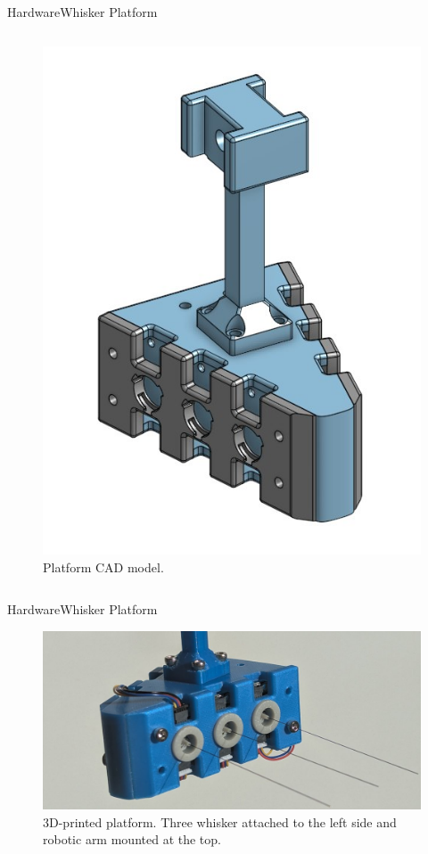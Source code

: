 \documentclass[AIRbeamer
,optEnglish
,optBiber
,optBibstyleAlphabetic
,optBeamerClassicFormat%
]{AIRlatex}
\begin{document}
\begin{frame}[c]{Hardware}{Whisker Platform}
\begin{column}[T]{0.5\textwidth}
\begin{figure}[H]
                \includegraphics[height=0.7\textheight]{figures/platform-cad}
                \caption{Platform CAD model.}
            \end{figure}
        \end{column}
    \end{frame}

    \begin{frame}{Hardware}{Whisker Platform}
        \begin{figure}[H]
            \centering
            \includegraphics[width=1\textwidth]{figures/platform}
            \caption{3D-printed platform. Three whisker attached to the left side and robotic arm mounted at the top.}
        \end{figure}
    \end{frame}
\end{document}
